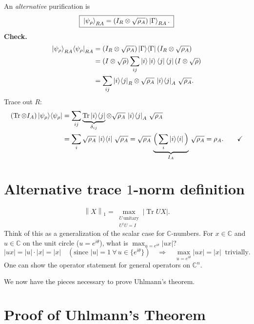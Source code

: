 \documentclass[11pt]{article}
\newcommand{\Tr}{\operatorname{Tr}}
\newcommand{\onenorm}[1]{\left\lVert #1 \right\rVert_{1}}
\newcommand{\C}{\mathbb{C}}
\begin{document}
An \emph{alternative} purification is
\[
\boxed{\;\ket{\psi_\rho}_{RA} = (I_R\otimes\sqrt{\rho_A})\ket{\Gamma}_{RA}.\;}
\]
\textbf{Check.}
\begin{align*}
\ket{\psi_\rho}_{RA}\!\bra{\psi_\rho}_{RA}
&= (I_R\otimes\sqrt{\rho_A})\ket{\Gamma}\!\bra{\Gamma}(I_R\otimes\sqrt{\rho_A})\\
&= (I\otimes\sqrt{\rho})\sum_{ij}\ket{i}\ket{i}\bra{j}\bra{j}(I\otimes\sqrt{\rho})\\
&= \sum_{ij}\ket{i}\!\bra{j}_R \otimes \sqrt{\rho_A}\,\ket{i}\!\bra{j}_A\,\sqrt{\rho_A}.
\end{align*}
Trace out $R$:
\begin{align*}
(\Tr\otimes I_A)\ket{\psi_\rho}\!\bra{\psi_\rho}
&= \sum_{ij}\underbrace{\Tr\ket{i}\!\bra{j}}_{\delta_{ij}} \otimes \sqrt{\rho_A}\,\ket{i}\!\bra{j}_A\,\sqrt{\rho_A}\\
&= \sum_i \sqrt{\rho_A}\,\ket{i}\!\bra{i}\,\sqrt{\rho_A}
= \sqrt{\rho_A}\,\underbrace{\Big(\sum_i \ket{i}\!\bra{i}\Big)}_{I_A}\,\sqrt{\rho_A}
= \rho_A. \qquad\checkmark
\end{align*}

\section{Alternative trace \texorpdfstring{$1$}{1}-norm definition}

\[
\onenorm{X} = \max_{\substack{U\ \text{unitary}\\ U^{\dagger}U=I}} |\Tr UX|.
\]
Think of this as a generalization of the scalar case for $\C$-numbers. For
$x\in\C$ and $u\in\C$ on the unit circle ($u=e^{i\theta}$), what is
$\max_{u=e^{i\theta}}|ux|$?
\[
|ux| = |u|\cdot|x| = |x|
\quad(\text{since } |u|=1\ \forall\, u\in\{e^{i\theta}\})
\quad\Longrightarrow\quad
\max_{u=e^{i\theta}}|ux| = |x|\ \text{ trivially.}
\]
One can show the operator statement for general operators on $\C^{n}$.

\medskip
\noindent We now have the pieces necessary to prove Uhlmann's theorem.

\section{Proof of Uhlmann's Theorem}
\end{document}
